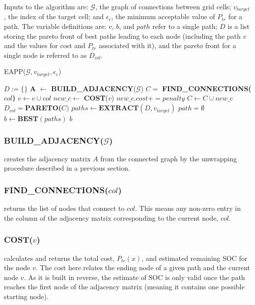 \documentclass[journal]{IEEEtran}
\newcounter{row}
\newcounter{col}
\begin{document}
Inputs to the algorithm are: $\mathcal{G}$, the graph of connections between grid cells; $v_{target}$, the index of the target cell; and $\epsilon_c$, the minimum acceptable value of $P_{tr}$ for a path. The variable definitions are: $v$, $b$, and $path$ refer to a single path; $D$ is a list storing the pareto front of best paths leading to each node (including the path $v$ and the values for cost and $P_{tr}$ associated with it), and the pareto front for a single node is referred to as $D_{col}$.
\bigskip

\textsc{EAPP}($\mathcal{G}, v_{target}, \epsilon_c$)
\begin{algorithmic}[1]
\STATE $D:=\{\}$ 
\STATE \textbf{A} $\leftarrow$ \textbf{BUILD\_ADJACENCY}($\mathcal{G}$)
\STATE $C =$ \textbf{FIND\_CONNECTIONS($col$)}
\STATE $v  \leftarrow v \cup col$ 
\STATE $new\_c \leftarrow$ \textbf{COST}($v$)
\STATE $new\_c.cost += penalty $ 
\ENDIF
\STATE $C \leftarrow C \cup new\_c$ 
\STATE $D_{col} = $\textbf{PARETO($C)$}
\ENDFOR
\ENDFOR
\STATE $paths \leftarrow \textbf{EXTRACT}(D, v_{target})$
\STATE $path = \emptyset$
\ENDIF
\ENDFOR
\STATE $b \leftarrow \textbf{BEST}(paths)$
\RETURN $b$
\end{algorithmic}

\subsubsection{BUILD\_ADJACENCY($\mathcal{G}$)} creates the adjacency matrix $A$ from the connected graph by the unwrapping procedure described in a previous section.
\subsubsection{FIND\_CONNECTIONS($col$)} returns the list of nodes that connect to $col$. This means any non-zero entry in the column of the adjacency matrix corresponding to the current node, $col$.
\subsubsection{COST($v$)} calculates and returns the total cost, $P_{tr}(x)$, and estimated remaining SOC for the node $v$. The cost here relates the ending node of a given path and the current node $v$. As it is built in reverse, the estimate of SOC is only valid once the path reaches the first node of the adjacency matrix (meaning it contains one possible starting node).
\end{document}
